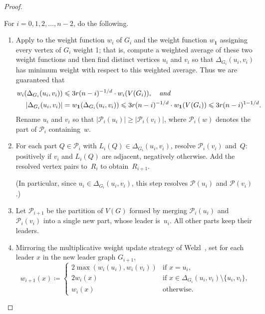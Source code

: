 \documentclass[11pt]{article}
\theoremstyle{definition}
\newcommand{\PP}{{\mathcal P}}
\renewcommand{\leq}{\leqslant}
\renewcommand{\ge}{\geqslant}
\newcommand{\Pp}{\mathcal{P}}
\begin{document}
\begin{proof}
\begin{tcolorbox}[breakable, enhanced, colback=black!5, colframe=black!40, boxrule=0.5pt, left=6pt, right=6pt, top=6pt, bottom=6pt]
    \noindent For $i=0,1,2,\ldots, n-2$, do the following.\begin{enumerate}[leftmargin=*]
    \item\label{itm:twoWeightsStep} Apply  to the weight function $w_i$ of $G_i$ and the weight function $w_\mathbf{1}$ assigning every vertex of $G_i$ weight 1; that is, compute a weighted average of these two weight functions and then find distinct vertices $u_i$ and $v_i$ so that $\Delta_{G_i}(u_i, v_i)$ has minimum weight with respect to this weighted average. Thus we are guaranteed that\begin{align}\label{equationMUW} w_i(\Delta_{G_i}(u_i, v_i)) &\leq 3r (n-i)^{-1/d} \cdot w_i(V(G_i)),\textit{\quad and}\\
      \label{equationSize}
    |\Delta_{G_i}(u_i, v_i)|
    &=
    w_\mathbf{1}(\Delta_{G_i}(u_i, v_i))
    \leq
    3r (n-i)^{-1/d} \cdot w_\mathbf{1}(V(G_i))
    \leq 3r (n-i)^{1-1/d}.
    \end{align}
    Rename $u_i$ and $v_i$ so that $|\Pp_i(u_i)| \ge |\Pp_i(v_i)|$, where $\Pp_i(w)$ denotes the part of $\Pp_i$ containing~$w$.
    \item\label{itm:resolveStep} For each part $Q\in\Pp_i$ with $L_i(Q)\in\Delta_{G_i}(u_i,v_i)$, resolve $\Pp_i(v_i)$ and~$Q$: positively if $v_i$ and $L_i(Q)$ are adjacent, negatively otherwise. Add the resolved vertex pairs to~$R_i$ to obtain~$R_{i+1}$.

    (In particular, since $u_i \in\Delta_{G_i}(u_i,v_i)$, this step resolves $\PP(u_i)$ and $\PP(v_i)$.)
    \item\label{itm:leaderChoice} Let $\Pp_{i+1}$ be the partition of $V(G)$ formed by merging $\Pp_i(u_i)$ and $\Pp_i(v_i)$ into a single new part, whose leader is~$u_i$. All other parts keep their leaders.
    \item\label{itm:weightUpdate}
        Mirroring the multiplicative weight update strategy of Welzl~\cite{Welzl88, ChazelleWelzl89},
        set for each leader $x$ in the new leader graph $G_{i+1}$,
    \[
    w_{i+1}(x)\coloneqq
    \begin{cases}
    2\max(w_i(u_i),w_i(v_i)) & \text{if } x=u_i,\\
    2w_i(x) & \text{if } x\in \Delta_{G_i}(u_i,v_i)\setminus\{u_i,v_i\},\\
    w_i(x) & \text{otherwise.}
    \end{cases}
    \]
    \end{enumerate}
    \end{tcolorbox}


\end{proof}
\end{document}
